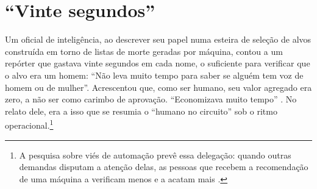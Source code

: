 \chapter{“Vinte segundos”}
\label{sec:1}
Um oficial de inteligência, ao descrever seu papel numa esteira de seleção de alvos construída em torno de listas de morte geradas por máquina, contou a um repórter que gastava vinte segundos em cada nome, o suficiente para verificar que o alvo era um homem: “Não leva muito tempo para saber se alguém tem voz de homem ou de mulher”. Acrescentou que, como ser humano, seu valor agregado era zero, a não ser como carimbo de aprovação. “Economizava muito tempo” \autocite{abraham2024lavender}. No relato dele, era a isso que se resumia o “humano no circuito” sob o ritmo operacional.\footnote{A pesquisa sobre viés de automação prevê essa delegação: quando outras demandas disputam a atenção delas, as pessoas que recebem a recomendação de uma máquina a verificam menos e a acatam mais \autocite{parasuraman2010complacency}.}

